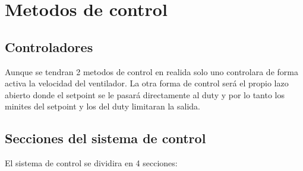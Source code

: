 \chapter[Metodos de control ]{Metodos de control}
\label{cp:metodos-control}

\section{Controladores}
Aunque se tendran 2 metodos de control en realida solo uno controlara de forma activa la velocidad del ventilador. La otra forma de control será el propio lazo abierto donde el setpoint se le pasará directamente al duty y por lo tanto los minites del setpoint y los del duty limitaran la salida.


\section{Secciones del sistema de control}
El sistema de control se dividira en 4 secciones:
